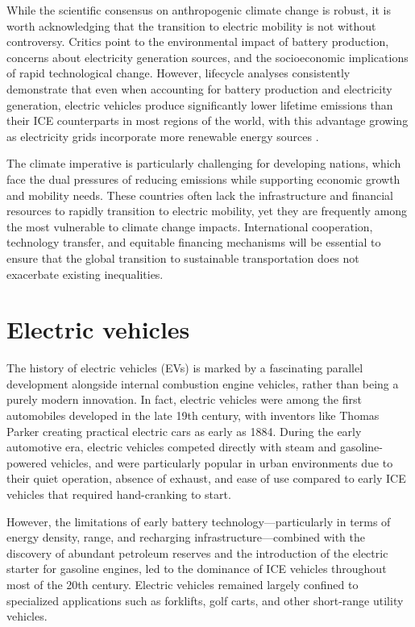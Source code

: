 While the scientific consensus on anthropogenic climate change is robust, it is worth acknowledging that the transition to electric mobility is not without controversy. Critics point to the environmental impact of battery production, concerns about electricity generation sources, and the socioeconomic implications of rapid technological change. However, lifecycle analyses consistently demonstrate that even when accounting for battery production and electricity generation, electric vehicles produce significantly lower lifetime emissions than their ICE counterparts in most regions of the world, with this advantage growing as electricity grids incorporate more renewable energy sources \cite{eea2018}.

The climate imperative is particularly challenging for developing nations, which face the dual pressures of reducing emissions while supporting economic growth and mobility needs. These countries often lack the infrastructure and financial resources to rapidly transition to electric mobility, yet they are frequently among the most vulnerable to climate change impacts. International cooperation, technology transfer, and equitable financing mechanisms will be essential to ensure that the global transition to sustainable transportation does not exacerbate existing inequalities.

\section{Electric vehicles}

The history of electric vehicles (EVs) is marked by a fascinating parallel development alongside internal combustion engine vehicles, rather than being a purely modern innovation. In fact, electric vehicles were among the first automobiles developed in the late 19th century, with inventors like Thomas Parker creating practical electric cars as early as 1884. During the early automotive era, electric vehicles competed directly with steam and gasoline-powered vehicles, and were particularly popular in urban environments due to their quiet operation, absence of exhaust, and ease of use compared to early ICE vehicles that required hand-cranking to start.

However, the limitations of early battery technology—particularly in terms of energy density, range, and recharging infrastructure—combined with the discovery of abundant petroleum reserves and the introduction of the electric starter for gasoline engines, led to the dominance of ICE vehicles throughout most of the 20th century. Electric vehicles remained largely confined to specialized applications such as forklifts, golf carts, and other short-range utility vehicles.

